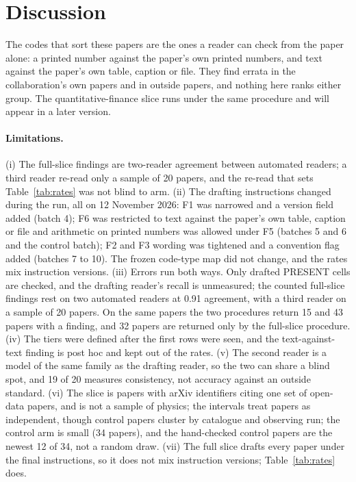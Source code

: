 \documentclass[reprint,amsmath,amssymb,aps,superscriptaddress,nofootinbib]{revtex4-2}
\begin{document}
\section{Discussion}

The codes that sort these papers are the ones a reader can check from the paper alone: a printed number against the paper's own printed numbers, and text against the paper's own table, caption or file. They find errata in the collaboration's own papers and in outside papers, and nothing here ranks either group. The quantitative-finance slice runs under the same procedure and will appear in a later version.

\paragraph*{Limitations.} (i) The full-slice findings are two-reader agreement between automated readers; a third reader re-read only a sample of 20 papers, and the re-read that sets Table~\ref{tab:rates} was not blind to arm. (ii) The drafting instructions changed during the run, all on 12 November 2026: F1 was narrowed and a version field added (batch 4); F6 was restricted to text against the paper's own table, caption or file and arithmetic on printed numbers was allowed under F5 (batches 5 and 6 and the control batch); F2 and F3 wording was tightened and a convention flag added (batches 7 to 10). The frozen code-type map did not change, and the rates mix instruction versions. (iii) Errors run both ways. Only drafted PRESENT cells are checked, and the drafting reader's recall is unmeasured; the counted full-slice findings rest on two automated readers at 0.91 agreement, with a third reader on a sample of 20 papers. On the same papers the two procedures return 15 and 43 papers with a finding, and 32 papers are returned only by the full-slice procedure. (iv) The tiers were defined after the first rows were seen, and the text-against-text finding is post hoc and kept out of the rates. (v) The second reader is a model of the same family as the drafting reader, so the two can share a blind spot, and 19 of 20 measures consistency, not accuracy against an outside standard. (vi) The slice is papers with arXiv identifiers citing one set of open-data papers, and is not a sample of physics; the intervals treat papers as independent, though control papers cluster by catalogue and observing run; the control arm is small (34 papers), and the hand-checked control papers are the newest 12 of 34, not a random draw. (vii) The full slice drafts every paper under the final instructions, so it does not mix instruction versions; Table~\ref{tab:rates} does.
\end{document}
